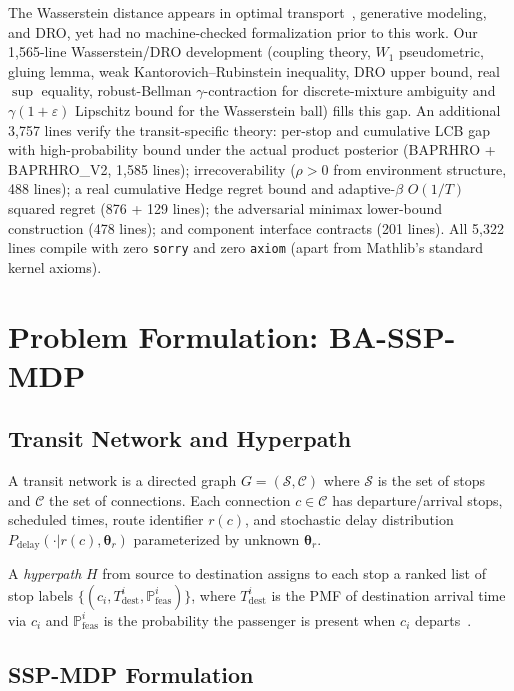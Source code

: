 \documentclass[11pt]{article}
\theoremstyle{definition}
\theoremstyle{remark}
\begin{document}
The Wasserstein distance appears in optimal transport~\cite{villani2009},
generative modeling, and DRO, yet had no machine-checked formalization
prior to this work.
Our 1{,}565-line Wasserstein/DRO development (coupling theory,
$W_1$ pseudometric, gluing lemma, weak Kantorovich--Rubinstein
inequality, DRO upper bound, real $\sup$ equality, robust-Bellman
$\gamma$-contraction for discrete-mixture ambiguity and
$\gamma(1+\varepsilon)$ Lipschitz bound for the Wasserstein ball)
fills this gap. An additional 3{,}757 lines
verify the transit-specific theory: per-stop and cumulative LCB
gap with high-probability bound under the actual product posterior
(BAPRHRO + BAPRHRO\_V2, 1{,}585 lines); irrecoverability ($\rho > 0$
from environment structure, 488 lines); a real cumulative Hedge
regret bound and adaptive-$\beta$ $O(1/T)$ squared regret (876 + 129
lines); the adversarial minimax lower-bound construction (478
lines); and component interface contracts (201 lines).
All 5{,}322 lines compile with zero \texttt{sorry} and zero
\texttt{axiom} (apart from Mathlib's standard kernel axioms).

\section{Problem Formulation: BA-SSP-MDP}
\label{sec:model}

\subsection{Transit Network and Hyperpath}

A transit network is a directed graph $G = (\mathcal{S}, \mathcal{C})$ where $\mathcal{S}$ is the set of stops and $\mathcal{C}$ the set of connections. Each connection $c \in \mathcal{C}$ has departure/arrival stops, scheduled times, route identifier $r(c)$, and stochastic delay distribution $P_{\mathrm{delay}}(\cdot | r(c), \bm{\theta}_r)$ parameterized by unknown $\bm{\theta}_r$.

A \emph{hyperpath} $H$ from source to destination assigns to each stop a ranked list of stop labels $\{(c_i, T_{\mathrm{dest}}^i, \mathbb{P}_{\mathrm{feas}}^i)\}$, where $T_{\mathrm{dest}}^i$ is the PMF of destination arrival time via $c_i$ and $\mathbb{P}_{\mathrm{feas}}^i$ is the probability the passenger is present when $c_i$ departs~\cite{durner2024}.

\subsection{SSP-MDP Formulation}
\end{document}
